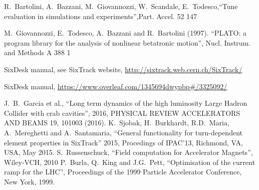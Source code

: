\documentclass[a4paper,11pt]{report}
\begin{document}
\begin{thebibliography}{99}
 R.~Bartolini, A.~Bazzani, M.~Giovannozzi, W.~Scandale, E.~Todesco,``Tune evaluation in simulations and experiments'',Part. Accel. 52 147

 M.~Giovannozzi, E.~Todesco, A.~Bazzani and R.~Bartolini (1997). ``PLATO: a program library for the analysis of nonlinear betatronic motion'', Nucl. Instrum. and Methods A 388 1

 SixDesk manual, see SixTrack website, \url{http://sixtrack.web.cern.ch/SixTrack/}

 SixDesk manual, \url{https://www.overleaf.com/1345694dwypbp#/3325092/}

%
%
 J.~B.~Garcia et al., 
``Long term dynamics of the high luminosity Large Hadron Collider with crab cavities'',
2016, PHYSICAL REVIEW ACCELERATORS AND BEAMS 19, 101003 (2016).
 K.~Sjobak, H.~Burkhardt, R.D.~Maria, A.~Mereghetti and A.~Santamaria,
  ``General functionality for turn-dependent element properties in SixTrack''
  2015, Procedings of IPAC'13, Richmond, VA, USA, May 2015.
%
 S.~Russenschuck,
  ``Field computation for Accelerator Magnets'',
  Wiley-VCH, 2010
 P.~Burla, Q.~King and J.G.~Pett,
  ``Optimisation of the current ramp for the LHC'',
  Proceedings of the 1999 Particle Accelerator Conference, New York, 1999.
  
%

\end{thebibliography}
\end{document}
